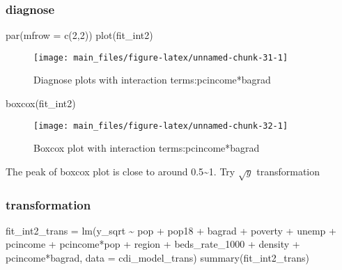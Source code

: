\documentclass[
  11pt,
]{article}
\newenvironment{Shaded}{\begin{snugshade}}{\end{snugshade}}
\newcommand{\AttributeTok}[1]{\textcolor[rgb]{0.77,0.63,0.00}{#1}}
\newcommand{\DecValTok}[1]{\textcolor[rgb]{0.00,0.00,0.81}{#1}}
\newcommand{\FunctionTok}[1]{\textcolor[rgb]{0.00,0.00,0.00}{#1}}
\newcommand{\NormalTok}[1]{#1}
\newcommand{\OtherTok}[1]{\textcolor[rgb]{0.56,0.35,0.01}{#1}}
\newcommand{\SpecialCharTok}[1]{\textcolor[rgb]{0.00,0.00,0.00}{#1}}
\begin{document}
\hypertarget{diagnose-1}{%
\subsubsection{diagnose}\label{diagnose-1}}

\begin{Shaded}
\begin{Highlighting}[]
\FunctionTok{par}\NormalTok{(}\AttributeTok{mfrow =} \FunctionTok{c}\NormalTok{(}\DecValTok{2}\NormalTok{,}\DecValTok{2}\NormalTok{))}
\FunctionTok{plot}\NormalTok{(fit\_int2)}
\end{Highlighting}
\end{Shaded}

\begin{figure}
\texttt{[image: main\_files/figure-latex/unnamed-chunk-31-1]} \caption{\label{fig:figs}Diagnose plots with interaction terms:pcincome*bagrad}\label{fig:unnamed-chunk-31}
\end{figure}

\begin{Shaded}
\begin{Highlighting}[]
\FunctionTok{boxcox}\NormalTok{(fit\_int2)}
\end{Highlighting}
\end{Shaded}

\begin{figure}
\texttt{[image: main\_files/figure-latex/unnamed-chunk-32-1]} \caption{\label{fig:figs}Boxcox plot with interaction terms:pcincome*bagrad}\label{fig:unnamed-chunk-32}
\end{figure}

The peak of boxcox plot is close to around 0.5\textasciitilde1. Try
\(\sqrt{y}\) transformation

\hypertarget{transformation-2}{%
\subsubsection{transformation}\label{transformation-2}}

\begin{Shaded}
\begin{Highlighting}[]
\NormalTok{fit\_int2\_trans }\OtherTok{=} \FunctionTok{lm}\NormalTok{(y\_sqrt }\SpecialCharTok{\textasciitilde{}}  
\NormalTok{                  pop }\SpecialCharTok{+}\NormalTok{ pop18 }\SpecialCharTok{+}\NormalTok{ bagrad }\SpecialCharTok{+}
\NormalTok{                  poverty }\SpecialCharTok{+}\NormalTok{ unemp }\SpecialCharTok{+}\NormalTok{ pcincome }\SpecialCharTok{+}\NormalTok{ pcincome}\SpecialCharTok{*}\NormalTok{pop }\SpecialCharTok{+}\NormalTok{ region }\SpecialCharTok{+}
\NormalTok{                  beds\_rate\_1000 }\SpecialCharTok{+}\NormalTok{ density }\SpecialCharTok{+}
\NormalTok{                  pcincome}\SpecialCharTok{*}\NormalTok{bagrad, }\AttributeTok{data =}\NormalTok{ cdi\_model\_trans)}
\FunctionTok{summary}\NormalTok{(fit\_int2\_trans)}
\end{Highlighting}
\end{Shaded}
\end{document}
